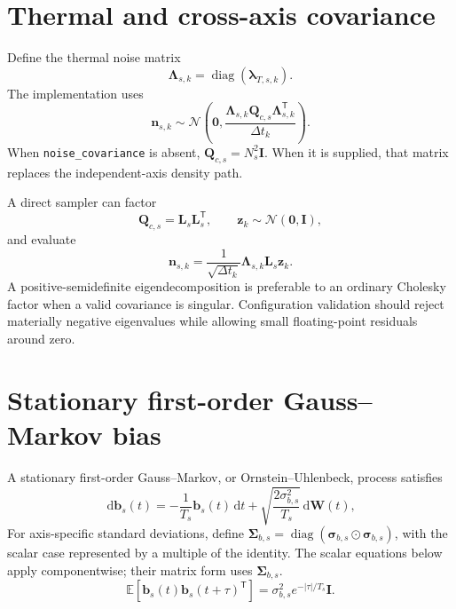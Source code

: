 \documentclass[11pt,oneside,headings=big]{scrreprt}
\newcommand{\Normal}{\mathcal{N}}
\newcommand{\E}{\mathbb{E}}
\newcommand{\diag}{\operatorname{diag}}
\newcommand{\Had}{\odot}
\newcommand{\dd}{\,\mathrm{d}}
\newcommand{\transpose}{\mathsf{T}}
\newcommand{\vect}[1]{\bm{#1}}
\newcommand{\mat}[1]{\bm{#1}}
\newcommand{\field}[1]{\texttt{#1}}
\begin{document}
    \section{Thermal and cross-axis covariance}
    Define the thermal noise matrix
    \begin{equation}
        \mat\Lambda_{s,k}
        =\diag(\vect\lambda_{T,s,k}).
    \end{equation}
    The implementation uses
    \begin{equation}
        \vect n_{s,k}\sim
        \Normal\!\left(
                     \vect0,
                     \frac{\mat\Lambda_{s,k}\mat Q_{c,s}
                         \mat\Lambda_{s,k}^{\transpose}}{\Delta t_k}
        \right).
        \label{eq:general-white}
    \end{equation}
    When \field{noise\_covariance} is absent,
    \(\mat Q_{c,s}=N_s^2\mat I\). When it is supplied, that matrix replaces the
    independent-axis density path.

    A direct sampler can factor
    \begin{equation}
        \mat Q_{c,s}=\mat L_s\mat L_s^\transpose,
        \qquad
        \vect z_k\sim\Normal(\vect0,\mat I),
    \end{equation}
    and evaluate
    \begin{equation}
        \vect n_{s,k}
        =\frac{1}{\sqrt{\Delta t_k}}
        \mat\Lambda_{s,k}\mat L_s\vect z_k.
        \label{eq:correlated-sampling}
    \end{equation}
    A positive-semidefinite eigendecomposition is preferable to an ordinary
    Cholesky factor when a valid covariance is singular. Configuration validation
    should reject materially negative eigenvalues while allowing small
    floating-point residuals around zero.


    \section{Stationary first-order Gauss--Markov bias}
    A stationary first-order Gauss--Markov, or Ornstein--Uhlenbeck, process satisfies
    \begin{equation}
        \dd\vect b_s(t)
        =-\frac{1}{T_s}\vect b_s(t)\dd t
        +\sqrt{\frac{2\sigma_{b,s}^{2}}{T_s}}\dd\vect W(t),
        \label{eq:ou-sde}
    \end{equation}
    For axis-specific standard deviations, define \(\mat\Sigma_{b,s}=\diag(\vect\sigma_{b,s}\Had\vect\sigma_{b,s})\), with the scalar case
    represented by a multiple of the identity. The scalar equations below apply
    componentwise; their matrix form uses \(\mat\Sigma_{b,s}\).
    \begin{equation}
        \E\!\left[\vect b_s(t)\vect b_s(t+\tau)^\transpose\right]
        =\sigma_{b,s}^{2}e^{-\lvert\tau\rvert/T_s}\mat I.
        \label{eq:ou-autocov}
    \end{equation}
\end{document}
